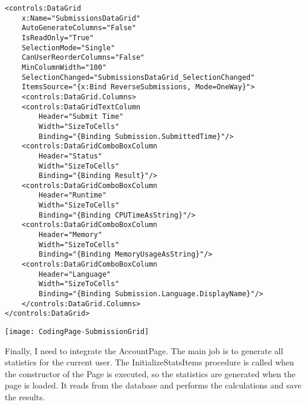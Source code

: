 \documentclass[report.tex]{subfiles}
\begin{document}
\begin{verbatim}
<controls:DataGrid
    x:Name="SubmissionsDataGrid"
    AutoGenerateColumns="False"
    IsReadOnly="True"
    SelectionMode="Single"
    CanUserReorderColumns="False"
    MinColumnWidth="100"
    SelectionChanged="SubmissionsDataGrid_SelectionChanged"
    ItemsSource="{x:Bind ReverseSubmissions, Mode=OneWay}">
    <controls:DataGrid.Columns>
    <controls:DataGridTextColumn
        Header="Submit Time"
        Width="SizeToCells"
        Binding="{Binding Submission.SubmittedTime}"/>
    <controls:DataGridComboBoxColumn
        Header="Status"
        Width="SizeToCells"
        Binding="{Binding Result}"/>
    <controls:DataGridComboBoxColumn
        Header="Runtime"
        Width="SizeToCells"
        Binding="{Binding CPUTimeAsString}"/>
    <controls:DataGridComboBoxColumn
        Header="Memory"
        Width="SizeToCells"
        Binding="{Binding MemoryUsageAsString}"/>
    <controls:DataGridComboBoxColumn
        Header="Language"
        Width="SizeToCells"
        Binding="{Binding Submission.Language.DisplayName}"/>
    </controls:DataGrid.Columns>
</controls:DataGrid>
\end{verbatim}

\texttt{[image: CodingPage-SubmissionGrid]}

Finally, I need to integrate the AccountPage. The main job is to generate all statistics for the current user. The InitializeStatsItems procedure is called when the constructor of the Page is executed, so the statistics are generated when the page is loaded. It reads from the database and performs the calculations and save the results.
\end{document}
